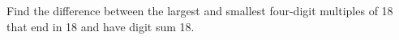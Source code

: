 Find the difference between the largest and smallest four-digit multiples of 18 that end in 18 and have digit sum 18.
